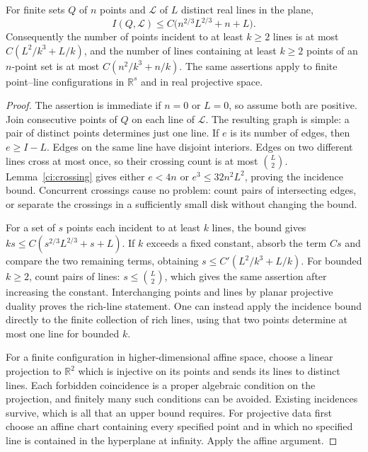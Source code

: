 \begin{theorem}\label{ci:st}
For finite sets $Q$ of $n$ points and $\mathcal L$ of $L$ distinct real
lines in the plane,
\[
 I(Q,\mathcal L)\le C\bigl(n^{2/3}L^{2/3}+n+L\bigr).
\]
Consequently the number of points incident to at least $k\ge2$ lines is
at most $C(L^2/k^3+L/k)$, and the number of lines containing at least
$k\ge2$ points of an $n$-point set is at most
$C(n^2/k^3+n/k)$.
The same assertions apply to finite point--line configurations in
$\mathbb R^s$ and in real projective space.
\end{theorem}

\begin{proof}
The assertion is immediate if $n=0$ or $L=0$, so assume both are positive.
Join consecutive points of $Q$ on each line of $\mathcal L$.  The
resulting graph is simple: a pair of distinct points determines just
one line.  If $e$ is its number of edges, then $e\ge I-L$.  Edges on
the same line have disjoint interiors.  Edges on two different lines
cross at most once, so their crossing count is at most $\binom L2$.
Lemma~\ref{ci:crossing} gives either $e<4n$ or
$e^3\le32n^2L^2$, proving the incidence bound.  Concurrent crossings
cause no problem: count pairs of intersecting edges, or separate the
crossings in a sufficiently small disk without changing the bound.

For a set of $s$ points each incident to at least $k$ lines, the bound
gives
$ks\le C(s^{2/3}L^{2/3}+s+L)$.  If $k$ exceeds a fixed constant,
absorb the term $Cs$ and compare the two remaining terms, obtaining
$s\le C'(L^2/k^3+L/k)$.  For bounded $k\ge2$, count pairs of lines:
$s\le\binom L2$, which gives the same assertion after increasing the
constant.  Interchanging points and lines by planar projective duality
proves the rich-line statement.  One can instead apply the incidence
bound directly to the finite collection of rich lines, using that two
points determine at most one line for bounded $k$.

For a finite configuration in higher-dimensional affine space, choose
a linear projection to $\mathbb R^2$ which is injective on its points
and sends its lines to distinct lines.  Each forbidden coincidence is
a proper algebraic condition on the projection, and finitely many such
conditions can be avoided.  Existing incidences survive, which is all
that an upper bound requires.  For projective data first choose an
affine chart containing every specified point and in which no specified
line is contained in the hyperplane at infinity.  Apply the affine
argument.
\end{proof}

